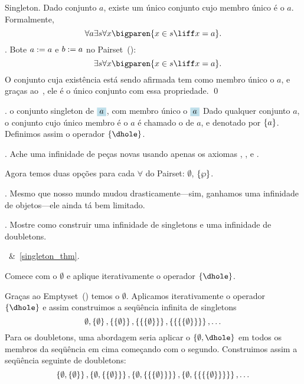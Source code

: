 {%
\theorem Singleton.
\label{singleton_thm}%
Dado conjunto $a$, existe um único conjunto cujo membro único é o $a$.
Formalmente,
$$
\forall a
\exists s
\forall x
\bigparen{
x\in s
\liff
x = a
}.
$$
\proof.
Bote $a\mathrel{:=} a$ e $b\mathrel{:=} a$ no Pairset~():
$$
\phantom{\forall a}
\exists s
\forall x
\bigparen{
x \in s
\liff
x = a
}.
$$
O conjunto cuja existência está sendo afirmada tem como membro único o $a$,
e graças ao~, ele é o único conjunto com essa propriedade.
\qed

.
\label{singleton}%
 {o conjunto singleton de $\holed a$, com membro único o $\holed a$}%
Dado qualquer conjunto $a$, o conjunto cujo único membro é o $a$
é chamado o  de $a$, e denotado por $\left\{a\right\}$.
Definimos assim o operador $\set{\dhole}$.

\exercise.
Ache uma infinidade de peças novas usando apenas os axiomas , , e .

\hint
Agora temos duas opções para cada $\forall$ do Pairset: $\emptyset$, $\set\powerset$.

\endexercise

\blah.
Mesmo que nosso mundo mudou drasticamente---sim, ganhamos uma infinidade de
objetos---ele ainda tá bem limitado.

\exercise.
Mostre como construir uma infinidade de singletons e uma infinidade de doubletons.

\hint
{}~\&~\ref{singleton_thm}.

\hint
Comece com o $\emptyset$ e aplique iterativamente o operador $\set{\dhole}$.

\solution
Graças ao Emptyset~() temos o $\emptyset$.
Aplicamos iterativamente o operador $\set{\dhole}$ e assim construimos
a seqüência infinita de singletons
$$
\emptyset,
\left\{\emptyset\right\},
\left\{\left\{\emptyset\right\}\right\},
\left\{\left\{\left\{\emptyset\right\}\right\}\right\},
\left\{\left\{\left\{\left\{\emptyset\right\}\right\}\right\}\right\},
\dotsc
$$
Para os doubletons, uma abordagem seria aplicar o $\set{\emptyset,\dhole}$
em todos os membros da seqüência em cima começando com o segundo.
Construimos assim a seqüência seguinte de doubletons:
$$
\left\{\emptyset, \left\{\emptyset\right\}\right\},
\left\{\emptyset, \left\{\left\{\emptyset\right\}\right\}\right\},
\left\{\emptyset, \left\{\left\{\left\{\emptyset\right\}\right\}\right\}\right\},
\left\{\emptyset, \left\{\left\{\left\{\left\{\emptyset\right\}\right\}\right\}\right\}\right\},
\dotsc
$$

}
